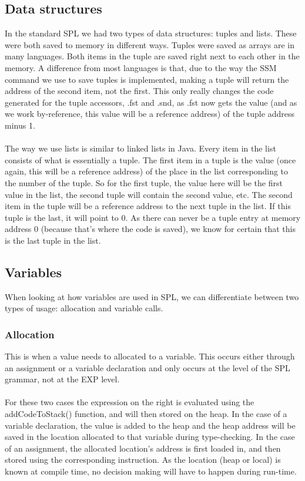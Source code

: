 \documentclass[10pt,a4paper]{article}
\begin{document}
\subsection{Data structures}
In the standard SPL we had two types of data structures: tuples and lists. These were both saved to memory in different ways. Tuples were saved as arrays are in many languages. Both items in the tuple are saved right next to each other in the memory. A difference from most languages is that, due to the way the SSM command we use to save tuples is implemented, making a tuple will return the address of the second item, not the first. This only really changes the code generated for the tuple accessors, .fst and .snd, as .fst now gets the value (and as we work by-reference, this value will be a reference address) of the tuple address minus 1.\\
\\
The way we use lists is similar to linked lists in Java. Every item in the list consists of what is essentially a tuple. The first item in a tuple is the value (once again, this will be a reference address) of the place in the list corresponding to the number of the tuple. So for the first tuple, the value here will be the first value in the list, the second tuple will contain the second value, etc. The second item in the tuple will be a reference address to the next tuple in the list. If this tuple is the last, it will point to 0. As there can never be a tuple entry at memory address 0 (because that's where the code is saved), we know for certain that this is the last tuple in the list.

\subsection{Variables}
When looking at how variables are used in SPL, we can differentiate between two types of usage: allocation and variable calls.
\subsubsection{Allocation}
This is when a value needs to allocated to a variable. This occurs either through an assignment or a variable declaration and only occurs at the level of the SPL grammar, not at the EXP level.\\
\\
For these two cases the expression on the right is evaluated using the addCodeToStack() function, and will then stored on the heap. In the case of a variable declaration, the value is added to the heap and the heap address will be saved in the location allocated to that variable during type-checking. In the case of an assignment, the allocated location's address is first loaded in, and then stored using the corresponding instruction. As the location (heap or local) is known at compile time, no decision making will have to happen during run-time.
\end{document}
